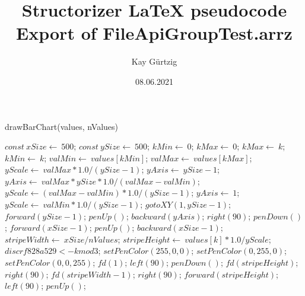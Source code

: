 \documentclass[a4paper,10pt]{article}
\title{Structorizer LaTeX pseudocode Export of FileApiGroupTest.arrz}
\author{Kay Gürtzig}
\date{08.06.2021}
\begin{document}
\begin{algorithm}
\caption{drawBarChart(values, nValues)}
\begin{algorithmic}[5]

\STATE {}
\STATE {}
\STATE {}
\STATE {}
  \STATE \(const\ xSize\gets\ 500\);
  \STATE \(const\ ySize\gets\ 500\);
  \STATE \(kMin\gets\ 0\);
  \STATE \(kMax\gets\ 0\);
      \STATE \(kMax\gets\ k\);
    \ELSE
        \STATE \(kMin\gets\ k\);
      \ENDIF
    \ENDIF
  \ENDFOR
  \STATE \(valMin\gets\ values[kMin]\);
  \STATE \(valMax\gets\ values[kMax]\);
  \STATE \(yScale\gets\ valMax*1.0/(ySize-1)\);
  \STATE \(yAxis\gets\ ySize-1\);
      \STATE \(yAxis\gets\ valMax*ySize*1.0/(valMax-valMin)\);
      \STATE \(yScale\gets(valMax-valMin)*1.0/(ySize-1)\);
    \ELSE
      \STATE \(yAxis\gets\ 1\);
      \STATE \(yScale\gets\ valMin*1.0/(ySize-1)\);
    \ENDIF
  \ENDIF
  \STATE \(gotoXY(1,ySize-1)\);
  \STATE \(forward(ySize-1)\);
  \STATE \(penUp()\);
  \STATE \(backward(yAxis)\);
  \STATE \(right(90)\);
  \STATE \(penDown()\);
  \STATE \(forward(xSize-1)\);
  \STATE \(penUp()\);
  \STATE \(backward(xSize-1)\);
  \STATE \(stripeWidth\gets\ xSize/nValues\);
    \STATE \(stripeHeight\gets\ values[k]*1.0/yScale\);
    \STATE \(discrf828a529 <- k mod 3\);
      \STATE \(setPenColor(255,0,0)\);
      \STATE \(setPenColor(0,255,0)\);
      \STATE \(setPenColor(0,0,255)\);
    \ENDIF
    \STATE \(fd(1)\);
    \STATE \(left(90)\);
    \STATE \(penDown()\);
    \STATE \(fd(stripeHeight)\);
    \STATE \(right(90)\);
    \STATE \(fd(stripeWidth-1)\);
    \STATE \(right(90)\);
    \STATE \(forward(stripeHeight)\);
    \STATE \(left(90)\);
    \STATE \(penUp()\);
  \ENDFOR

\end{algorithmic}
\end{algorithm}
\end{document}
